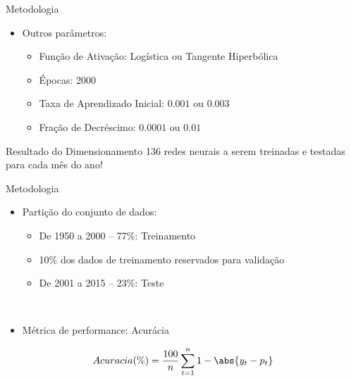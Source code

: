 \begin{frame}{Metodologia}
\begin{itemize}
\item Outros parâmetros:
\begin{itemize}
  \item Função de Ativação: Logística ou Tangente Hiperbólica
  \item Épocas: 2000
  \item Taxa de Aprendizado Inicial: $0.001$ ou $0.003$
  \item Fração de Decréscimo: $0.0001$ ou $0.01$
\end{itemize}
\end{itemize}
\begin{block}{Resultado do Dimensionamento}
  136 redes neurais a serem treinadas e testadas para cada mês do ano!
\end{block}
\end{frame}

\begin{frame}{Metodologia}
  \begin{itemize}
  \item Partição do conjunto de dados:
  \begin{itemize}
    \item De 1950 a 2000 -- 77$\%$: Treinamento
    \item 10$\%$ dos dados de treinamento reservados para validação
    \item De 2001 a 2015 -- 23$\%$: Teste
  \end{itemize}
  \ \ \newline
  \item Métrica de performance: Acurácia
  \end{itemize}
  \begin{equation}
		Acuracia(\%) = \frac{100}{n}\sum_{t=1}^n 1 - \abs{y_t - p_t}
	\end{equation}
\end{frame}
